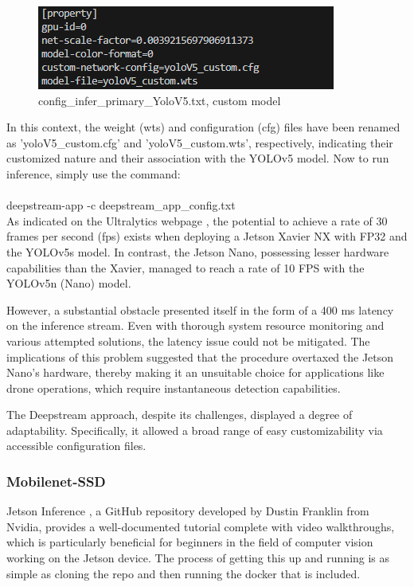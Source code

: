 \begin{figure}[H]
    \centering
    \includegraphics[scale=1]{evenbilder/yolo_deepstream__custom_model.png}
    \caption{config\_infer\_primary\_YoloV5.txt, custom model}
    \label{config_infer_primary}
\end{figure}

In this context, the weight (wts) and configuration (cfg) files have been renamed as 'yoloV5\_custom.cfg' and 'yoloV5\_custom.wts', respectively, indicating their customized nature and their association with the YOLOv5 model.
Now to run inference, simply use the command:\\
\\
deepstream-app -c deepstream\_app\_config.txt\\

As indicated on the Ultralytics webpage \cite{yolo_on_jetson}, the potential to achieve a rate of 30 frames per second (fps) exists when deploying a Jetson Xavier NX with FP32 and the YOLOv5s model. In contrast, the Jetson Nano, possessing lesser hardware capabilities than the Xavier, managed to reach a rate of 10 FPS with the YOLOv5n (Nano) model.

However, a substantial obstacle presented itself in the form of a 400 ms latency on the inference stream. Even with thorough system resource monitoring and various attempted solutions, the latency issue could not be mitigated. The implications of this problem suggested that the procedure overtaxed the Jetson Nano's hardware, thereby making it an unsuitable choice for applications like drone operations, which require instantaneous detection capabilities.

The Deepstream approach, despite its challenges, displayed a degree of adaptability. Specifically, it allowed a broad range of easy customizability via accessible configuration files.
\newpage



\subsubsection{Mobilenet-SSD}
Jetson Inference \cite{Jetson_inference}, a GitHub repository developed by Dustin Franklin from Nvidia, provides a well-documented tutorial complete with video walkthroughs, which is particularly beneficial for beginners in the field of computer vision working on the Jetson device. The process of getting this up and running is as simple as cloning the repo and then running the docker that is included. 

